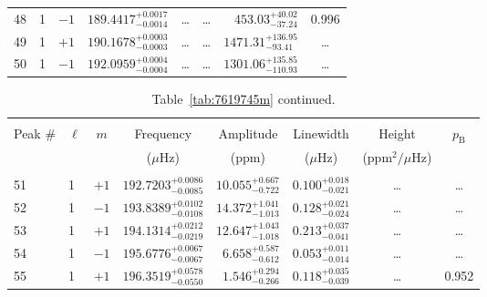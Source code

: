 \begin{table*}[!]
\begin{tabular}{llcrrlrc}
48 & 1 & $-1$ & $    189.4417_{-      0.0014}^{+      0.0017}$ & \multicolumn{1}{c}{\dots} & \multicolumn{1}{c}{\dots} & $      453.03_{-       37.24}^{+       40.02}$ & 0.996 \\[1pt]
49 & 1 & $+1$ & $    190.1678_{-      0.0003}^{+      0.0003}$ & \multicolumn{1}{c}{\dots} & \multicolumn{1}{c}{\dots} & $     1471.31_{-       93.41}^{+      136.95}$ & \dots \\[1pt]
50 & 1 & $-1$ & $    192.0959_{-      0.0004}^{+      0.0004}$ & \multicolumn{1}{c}{\dots} & \multicolumn{1}{c}{\dots} & $     1301.06_{-      110.93}^{+      135.85}$ & \dots \\[1pt]
\hline
\end{tabular}
\end{table*}

\begin{table*}[!]
\caption{Table~\ref{tab:7619745m} continued.}
\label{tab:7619745m2}
\centering
\begin{tabular}{llcrrlrc}
\hline\hline
\\[-8pt]          
Peak \# & $\ell$ & $m$ & \multicolumn{1}{c}{Frequency} & \multicolumn{1}{c}{Amplitude} & \multicolumn{1}{c}{Linewidth} & \multicolumn{1}{c}{Height}& $p_\mathrm{B}$\\
 & & & \multicolumn{1}{c}{($\mu$Hz)} & \multicolumn{1}{c}{(ppm)} & \multicolumn{1}{c}{($\mu$Hz)} & \multicolumn{1}{c}{(ppm$^2/\mu$Hz)}\\
\hline \\[-8pt]
51 & 1 & $+1$ & $    192.7203_{-      0.0085}^{+      0.0086}$ & $      10.055_{-       0.722}^{+       0.667}$ & $       0.100_{-       0.021}^{+       0.018}$ & \multicolumn{1}{c}{\dots} & \dots \\[1pt]
52 & 1 & $-1$ & $    193.8389_{-      0.0108}^{+      0.0102}$ & $      14.372_{-       1.013}^{+       1.041}$ & $       0.128_{-       0.024}^{+       0.021}$ & \multicolumn{1}{c}{\dots} & \dots \\[1pt]
53 & 1 & $+1$ & $    194.1314_{-      0.0219}^{+      0.0212}$ & $      12.647_{-       1.018}^{+       1.043}$ & $       0.213_{-       0.041}^{+       0.037}$ & \multicolumn{1}{c}{\dots} & \dots \\[1pt]
54 & 1 & $-1$ & $    195.6776_{-      0.0067}^{+      0.0067}$ & $       6.658_{-       0.612}^{+       0.587}$ & $       0.053_{-       0.014}^{+       0.011}$ & \multicolumn{1}{c}{\dots} & \dots \\[1pt]
55 & 1 & $+1$ & $    196.3519_{-      0.0550}^{+      0.0578}$ & $       1.546_{-       0.266}^{+       0.294}$ & $       0.118_{-       0.039}^{+       0.035}$ & \multicolumn{1}{c}{\dots} & 0.952 \\[1pt]


\end{tabular}
\end{table*}
